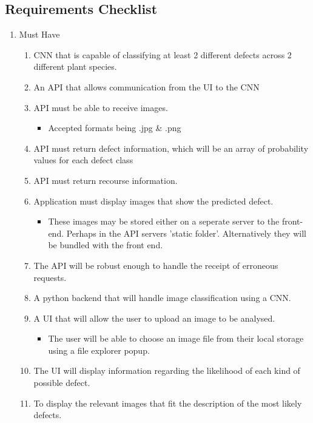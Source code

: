   \subsection{Requirements Checklist}
    \begin{enumerate}
      \item Must Have
      \begin{enumerate}
        \item CNN that is capable of classifying at least 2 different defects across 2 different plant species.\checkmark
        \item An API that allows communication from the UI to the CNN \checkmark
        \item API must be able to receive images. \checkmark
          \begin{itemize}
            \item Accepted formats being .jpg \& .png
          \end{itemize}
        \item API must return defect information, which will be an array of probability values for each defect class \checkmark
        \item API must return recourse information. \checkmark
        \item Application must display images that show the predicted defect. \checkmark
          \begin{itemize}
            \item These images may be stored either on a seperate server to the front-end. Perhaps in the API servers 'static folder'. Alternatively they will be bundled with the front end.
          \end{itemize}
      	\item The API will be robust enough to handle the receipt of erroneous requests. \checkmark
      	\item A python backend that will handle image classification using a CNN. \checkmark
      	\item A UI that will allow the user to upload an image to be analysed. \checkmark
        \begin{itemize}
          \item The user will be able to choose an image file from their local storage using a file explorer popup.
        \end{itemize}
      	\item The UI will display information regarding the likelihood of each kind of possible defect. \checkmark
      	\item To display the relevant images that fit the description of the most likely defects.\checkmark

\end{enumerate}
\end{enumerate}
